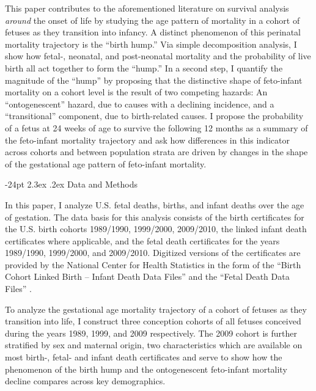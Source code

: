 \documentclass[10pt, twoside]{article}
\makeatletter
\renewcommand\section{\@startsection {section}{1}{\z@}%
                                   {-24pt}%
                                   {2.3ex \@plus.2ex}%
                                   {\normalfont\large\bfseries}}
\makeatother
\begin{document}
This paper contributes to the aforementioned literature on survival analysis \emph{around} the onset of life by studying the age pattern of mortality in a cohort of fetuses as they transition into infancy. A distinct phenomenon of this perinatal mortality trajectory is the ``birth hump.'' Via simple decomposition analysis, I show how fetal-, neonatal, and post-neonatal mortality and the probability of live birth all act together to form the ``hump.'' In a second step, I quantify the magnitude of the ``hump'' by proposing that the distinctive shape of feto-infant mortality on a cohort level is the result of two competing hazards: An ``ontogenescent'' hazard, due to causes with a declining incidence, and a ``transitional'' component, due to birth-related causes. I propose the probability of a fetus at 24 weeks of age to survive the following 12 months as a summary of the feto-infant mortality trajectory and ask how differences in this indicator across cohorts and between population strata are driven by changes in the shape of the gestational age pattern of feto-infant mortality.

\hypertarget{data-and-methods}{%
\section{Data and Methods}\label{data-and-methods}}

In this paper, I analyze U.S. fetal deaths, births, and infant deaths over the age of gestation. The data basis for this analysis consists of the birth certificates for the U.S. birth cohorts 1989/1990, 1999/2000, 2009/2010, the linked infant death certificates where applicable, and the fetal death certificates for the years 1989/1990, 1999/2000, and 2009/2010. Digitized versions of the certificates are provided by the National Center for Health Statistics in the form of the ``Birth Cohort Linked Birth -- Infant Death Data Files'' \citep{NCHS2016} and the ``Fetal Death Data Files'' \citep[see also \citet{Martin2002} for an introduction]{NCHS2016b}.

To analyze the gestational age mortality trajectory of a cohort of fetuses as they transition into life, I construct three conception cohorts of all fetuses conceived during the years 1989, 1999, and 2009 respectively. The 2009 cohort is further stratified by sex and maternal origin, two characteristics which are available on most birth-, fetal- and infant death certificates and serve to show how the phenomenon of the birth hump and the ontogenescent feto-infant mortality decline compares across key demographics.
\end{document}
